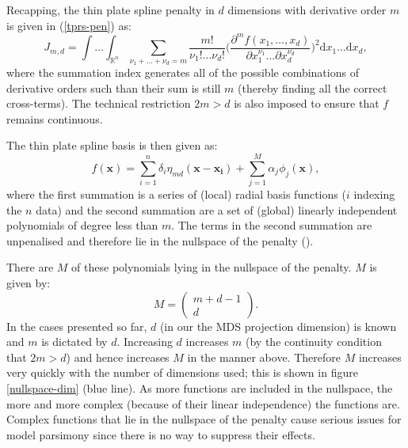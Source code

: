 Recapping, the thin plate spline penalty in $d$ dimensions with derivative order $m$ is given in (\ref{tprs-pen}) as:
\begin{equation*}
J_{m,d} = \int \ldots \int_{\mathbb{R}^n} \sum_{\nu_1 + \dots + \nu_d=m} \frac{m!}{\nu_1! \dots \nu_d!}\Big( \frac{\partial^m f(x_1,\dots,x_d)}{\partial x_1^{\nu_1} \ldots  \partial x_d^{\nu_d}} \Big)^2 \text{d} x_1 \ldots  \text{d} x_d,
\end{equation*}
where the summation index generates all of the possible combinations of derivative orders such than their sum is still $m$ (thereby finding all the correct cross-terms). The technical restriction $2m>d$ is also imposed to ensure that $f$ remains continuous.

The thin plate spline basis is then given as:
\begin{equation}
f(\mathbf{x}) = \sum_{i=1}^n \delta_i \eta_{md}(\mathbf{x}-\mathbf{x_i}) + \sum_{j=1}^M \alpha_j \phi_j(\mathbf{x}),
\label{tprs-basis}
\end{equation}
where the first summation is a series of (local) radial basis functions ($i$ indexing the $n$ data) and the second summation are a set of (global) linearly independent polynomials of degree less than $m$. The terms in the second summation are unpenalised and therefore lie in the nullspace of the penalty (\cite{wood2003}). 

There are $M$ of these polynomials lying in the nullspace of the penalty. $M$ is given by:
\begin{equation*}
M=\begin{pmatrix} m+d-1 \\ d  \end{pmatrix}.
\end{equation*}
In the cases presented so far, $d$ (in our the MDS projection dimension) is known and $m$ is dictated by $d$. Increasing $d$ increases $m$ (by the continuity condition that $2m>d$) and hence increases $M$ in the manner above. Therefore $M$ increases very quickly with the number of dimensions used; this is shown in figure \ref{nullspace-dim} (blue line). As more functions are included in the nullspace, the more and more complex (because of their linear independence) the functions are. Complex functions that lie in the nullspace of the penalty cause serious issues for model parsimony since there is no way to suppress their effects. 

